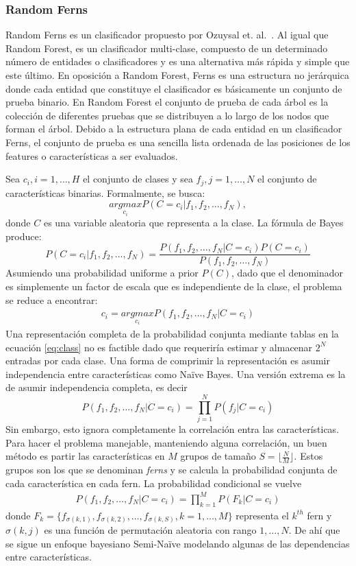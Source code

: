\subsubsection{Random Ferns} 
\label{subsection:ferns}
	
		Random Ferns es un clasificador propuesto por Ozuysal et. al.~\cite{Ozuysal}. Al igual que Random Forest, es un clasificador multi-clase, compuesto de un determinado número de entidades o clasificadores y es una alternativa más rápida y simple que este último. En oposición a Random Forest, Ferns es una estructura no jerárquica donde cada entidad que constituye el clasificador es básicamente un conjunto de prueba binario. En Random Forest el conjunto de prueba de cada árbol es la colección de diferentes pruebas que se distribuyen a lo largo de los nodos que forman el árbol. Debido a la estructura plana de cada entidad en un clasificador Ferns, el conjunto de prueba es una sencilla lista ordenada de las posiciones de los features o características a ser evaluados.
		
		Sea $c_i, i=1,\dots,H$ el conjunto de clases y  sea $f_j, j=1,\dots,N$ el conjunto de características binarias. Formalmente, se busca:
		$$\underset{c_i}{argmax}P(C=c_i \vert f_1,f_2,\dots,f_N),$$
		donde $C$ es una variable aleatoria que representa a la clase. La fórmula de Bayes produce:
		$$P(C=c_i \vert f_1,f_2,\dots,f_N) = \frac{P(f_1,f_2,\dots,f_N \vert C=c_i)P(C=c_i)}{P(f_1,f_2,\dots,f_N)}$$
		Asumiendo una probabilidad uniforme a prior $P(C)$, dado que el denominador es simplemente un factor de escala que es independiente de la clase, el problema se reduce a encontrar:
		\begin{align}\label{eq:class}
			c_i  = \underset{c_i}{argmax}P(f_1,f_2,\dots,f_N \vert C=c_i)
		\end{align}
		Una representación completa de la probabilidad conjunta mediante tablas en la ecuación \ref{eq:class} no es factible dado que requeriría estimar y almacenar $2^N$ entradas por cada clase. Una forma de comprimir la representación es asumir independencia entre características como Na\"{i}ve Bayes. Una versión extrema es la de asumir independencia completa, es decir
		$$P(f_1,f_2,\dots,f_N \vert C=c_i) = \prod_{j=1}^NP(f_j \vert C=c_i)$$
		Sin embargo, esto ignora completamente la correlación entra las características. Para hacer el problema manejable, manteniendo alguna correlación, un buen método es partir las características en $M$ grupos de tamaño $S=\lfloor \frac{N}{M} \rfloor$. Estos grupos son los que se denominan \textit{ferns} y se calcula la probabilidad conjunta de cada característica en cada fern. La probabilidad condicional se vuelve
		\begin{align}\label{eq:class2}
			P(f_1,f_2,\dots,f_N \vert C=c_i) = \prod_{k=1}^MP(F_k \vert C=c_i)
		\end{align}
		donde $F_k = \{ f_{\sigma(k,1)},f_{\sigma(k,2)},\dots,f_{\sigma(k,S)}, k=1,\dots,M \}$ representa el $k^{th}$ fern y $\sigma(k,j)$ es una función de permutación aleatoria con rango $1,\dots,N$. De ahí que se sigue un enfoque bayesiano Semi-Na\"{i}ve modelando algunas de las dependencias entre características.

